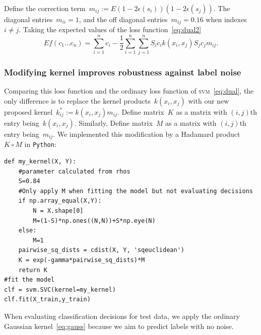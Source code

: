 \documentclass[12pt]{article} %
\newcommand{\svm}{\textsc{svm}}
\begin{document}
Define the correction term~$m_{ij}:=E(1-2\epsilon(s_i))(1-2\epsilon(s_j))$. The diagonal entries~$m_{ii}=1$, and the off diagonal entries~$m_{ij}=0.16$ when indexes~$i\neq j$. Taking the expected values of the loss function~\eqref{eq:dual2}
\begin{equation}
   Ef(c_{1}\ldots c_{n})=\sum _{i=1}^{n}c_{i}-{\frac {1}{2}}\sum _{i=1}^{n}\sum _{j=1}^{n}S_{i}c_{i}k(x_{i},x_{j})S_{j}c_{j}m_{ij}. \label{eq:dual3}
\end{equation}

\subsubsection{Modifying kernel improves robustness against label noise} \label{sec:mod}

Comparing this loss function and the ordinary loss function of \svm\ \eqref{eq:dual}, the only difference is to replace the kernel products~$k(x_i,x_j)$ with our new proposed kernel~$k^*_{ij}:=k(x_i,x_j)m_{ij}$. Define matrix~$K$ as a matrix with $(i,j)$th entry being~$k(x_i,x_j)$. Similarly, Define matrix~$M$ as a matrix with $(i,j)$th entry being~$m_{ij}$. We implemented this modification by a Hadamard product~$K\circ M$ in \texttt{Python}:
\begin{lstlisting}[caption=Customised kernel for Expectation Maximisation Algorithm, label=matn1]
def my_kernel(X, Y):
    #parameter calculated from rhos  
    S=0.84
    #Only apply M when fitting the model but not evaluating decisions
    if np.array_equal(X,Y):
        N = X.shape[0]
        M=(1-S)*np.ones((N,N))+S*np.eye(N)
    else:
        M=1    
    pairwise_sq_dists = cdist(X, Y, 'sqeuclidean')
    K = exp(-gamma*pairwise_sq_dists)*M
    return K
#fit the model
clf = svm.SVC(kernel=my_kernel)
clf.fit(X_train,y_train)
\end{lstlisting}
When evaluating classification decisions for test data, we apply the ordinary Gaussian kernel~\eqref{eq:gauss} because we aim to predict labels with no noise. 
\end{document}
